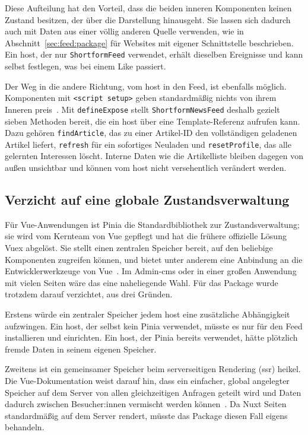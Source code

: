 Diese Aufteilung hat den Vorteil, dass die beiden inneren Komponenten keinen Zustand besitzen, der über die Darstellung hinausgeht.
Sie lassen sich dadurch auch mit Daten aus einer völlig anderen Quelle verwenden, wie in Abschnitt~\ref{sec:feed:package} für Websites mit eigener Schnittstelle beschrieben.
Ein \gls{host}, der nur \texttt{ShortformFeed} verwendet, erhält dieselben Ereignisse und kann selbst festlegen, was bei einem Like passiert.

Der Weg in die andere Richtung, vom \gls{host} in den Feed, ist ebenfalls möglich.
Komponenten mit \texttt{<script setup>} geben standardmäßig nichts von ihrem Inneren preis~\cite{vuescriptsetup}.
Mit \texttt{defineExpose} stellt \texttt{ShortformNewsFeed} deshalb gezielt sieben Methoden bereit, die ein \gls{host} über eine Template-Referenz aufrufen kann.
Dazu gehören \texttt{findArticle}, das zu einer Artikel-ID den vollständigen geladenen Artikel liefert, \texttt{refresh} für ein sofortiges Neuladen und \texttt{resetProfile}, das alle gelernten Interessen löscht.
Interne Daten wie die Artikelliste bleiben dagegen von außen unsichtbar und können vom \gls{host} nicht versehentlich verändert werden.

\subsection{Verzicht auf eine globale Zustandsverwaltung}

Für Vue-Anwendungen ist Pinia die Standardbibliothek zur Zustandsverwaltung; sie wird vom Kernteam von Vue gepflegt und hat die frühere offizielle Lösung Vuex abgelöst.
Sie stellt einen zentralen Speicher bereit, auf den beliebige Komponenten zugreifen können, und bietet unter anderem eine Anbindung an die Entwicklerwerkzeuge von Vue~\cite{vuestate}.
Im Admin-\gls{cms} oder in einer großen Anwendung mit vielen Seiten wäre das eine naheliegende Wahl.
Für das Package wurde trotzdem darauf verzichtet, aus drei Gründen.

Erstens würde ein zentraler Speicher jedem \gls{host} eine zusätzliche Abhängigkeit aufzwingen.
Ein \gls{host}, der selbst kein Pinia verwendet, müsste es nur für den Feed installieren und einrichten.
Ein \gls{host}, der Pinia bereits verwendet, hätte plötzlich fremde Daten in seinem eigenen Speicher.

Zweitens ist ein gemeinsamer Speicher beim serverseitigen Rendering (\gls{ssr}) heikel.
Die Vue-Dokumentation weist darauf hin, dass ein einfacher, global angelegter Speicher auf dem Server von allen gleichzeitigen Anfragen geteilt wird und Daten dadurch zwischen Besucher:innen vermischt werden können~\cite{vuestate}.
Da Nuxt Seiten standardmäßig auf dem Server rendert, müsste das Package diesen Fall eigens behandeln.

